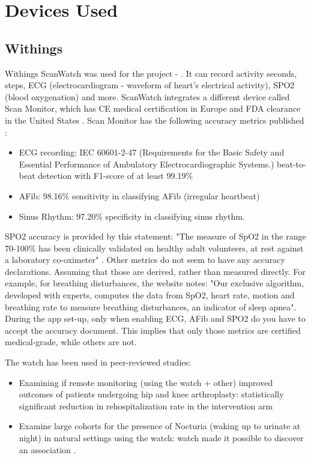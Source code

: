 \section{Devices Used}
\subsection{Withings}
\label{section:WithingsWatch}
Withings ScanWatch was used for the project - \cite{withingsStorePage}. It can record activity seconds, steps, ECG (electrocardiogram - waveform of heart's electrical activity), SPO2 (blood oxygenation) and more. ScanWatch integrates a different device called Scan Monitor, which has CE medical certification in Europe and FDA clearance in the United States \cite{withingsStorePage}.  Scan Monitor has the following accuracy metrics published \cite{scanMonitor}:
\begin{itemize}
    \item ECG recording: IEC 60601-2-47 (Requirements for the Basic Safety and Essential Performance of Ambulatory Electrocardiographic Systems.) beat-to-beat detection with F1-score of at least 99.19\% 
    \item AFib: 98.16\% sensitivity in classifying AFib (irregular heartbeat)
    \item Sinus Rhythm: 97.20\% specificity in classifying sinus rhythm.
\end{itemize}
SPO2 accuracy is provided by this statement: "The measure of SpO2 in the range 70-100\% has been clinically validated on healthy adult volunteers, at rest against a laboratory co-oximeter" \cite{scanMonitor}.
Other metrics do not seem to have any accuracy declarations. Assuming that those are derived, rather than measured directly. For example, for breathing disturbances, the website notes: "Our exclusive algorithm, developed with experts, computes the data from SpO2, heart rate, motion and breathing rate to measure breathing disturbances, an indicator of sleep apnea". During the app set-up, only when enabling ECG, AFib and SPO2 do you have to accept the accuracy document. This implies that only those metrics are certified medical-grade, while others are not.

The watch has been used in peer-reviewed studies:
\begin{itemize}
    \item Examining if remote monitoring (using the watch + other) improved outcomes of patients undergoing hip and knee arthroplasty: statistically significant reduction in rehospitalization rate in the intervention arm \cite{withingsHospitalization}
    \item Examine large cohorts for the presence of Nocturia (waking up to urinate at night) in natural settings using the watch: watch made it possible to discover an association \cite{withingsNocturia}.
\end{itemize}


